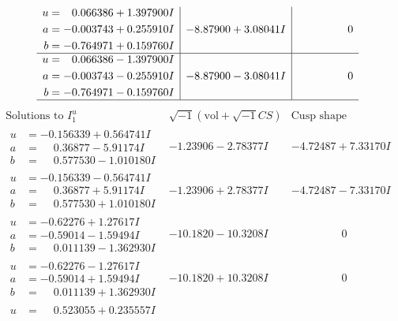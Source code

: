 \documentclass[1p]{elsarticle_modified}
\theoremstyle{definition}
\newcommand{\I}{\sqrt{-1}}
\begin{document}
$$\begin{array}{c|c|c}
\begin{aligned}
u &= \phantom{-}0.066386 + 1.397900 I \\
a &= -0.003743 + 0.255910 I \\
b &= -0.764971 + 0.159760 I\end{aligned}
 & -8.87900 + 3.08041 I & \phantom{-0.000000 } 0 \\ \hline\begin{aligned}
u &= \phantom{-}0.066386 - 1.397900 I \\
a &= -0.003743 - 0.255910 I \\
b &= -0.764971 - 0.159760 I\end{aligned}
 & -8.87900 - 3.08041 I & \phantom{-0.000000 } 0\\
 \hline 
 \end{array}$$\newpage$$\begin{array}{c|c|c}  
\text{Solutions to }I^u_{1}& \I (\text{vol} + \sqrt{-1}CS) & \text{Cusp shape}\\
 \hline 
\begin{aligned}
u &= -0.156339 + 0.564741 I \\
a &= \phantom{-}0.36877 - 5.91174 I \\
b &= \phantom{-}0.577530 - 1.010180 I\end{aligned}
 & -1.23906 - 2.78377 I & -4.72487 + 7.33170 I \\ \hline\begin{aligned}
u &= -0.156339 - 0.564741 I \\
a &= \phantom{-}0.36877 + 5.91174 I \\
b &= \phantom{-}0.577530 + 1.010180 I\end{aligned}
 & -1.23906 + 2.78377 I & -4.72487 - 7.33170 I \\ \hline\begin{aligned}
u &= -0.62276 + 1.27617 I \\
a &= -0.59014 - 1.59494 I \\
b &= \phantom{-}0.011139 - 1.362930 I\end{aligned}
 & -10.1820 - 10.3208 I & \phantom{-0.000000 } 0 \\ \hline\begin{aligned}
u &= -0.62276 - 1.27617 I \\
a &= -0.59014 + 1.59494 I \\
b &= \phantom{-}0.011139 + 1.362930 I\end{aligned}
 & -10.1820 + 10.3208 I & \phantom{-0.000000 } 0 \\ \hline\begin{aligned}
u &= \phantom{-}0.523055 + 0.235557 I \\

\end{aligned}
\end{array}$$
\end{document}
